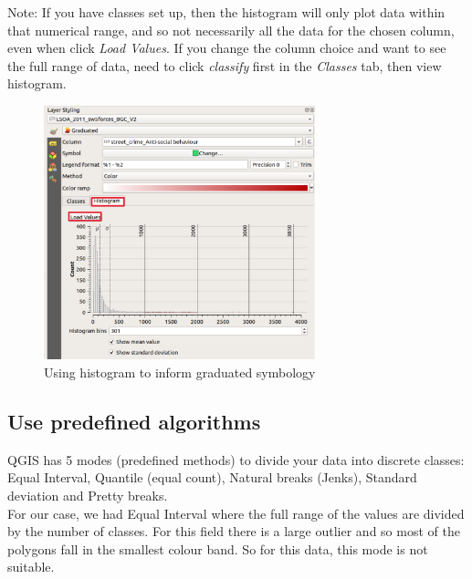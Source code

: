 Note: If you have classes set up, then the histogram will only plot data within that numerical range, and so not necessarily all the data for the chosen column, even when click \textit{Load Values}. If you change the column choice and want to see the full range of data, need to click \textit{classify} first in the \textit{Classes} tab, then view histogram.

\begin{figure}[!h]
	\centering
	\includegraphics[width=0.7\textwidth]{images/styling_histogram.png}
	\caption{Using histogram to inform graduated symbology}
	\label{ft_fig_firstfig3}
\end{figure}
\null\newpage
\subsection{Use predefined algorithms}

QGIS has 5 modes (predefined methods) to divide your data into discrete classes:\\
Equal Interval, Quantile (equal count), Natural breaks (Jenks), Standard deviation and Pretty breaks. \\

For our case, we had Equal Interval where the full range of the values are divided by the number of classes. For this field there is a large outlier and so most of the polygons fall in the smallest colour band. So for this data, this mode is not suitable.



